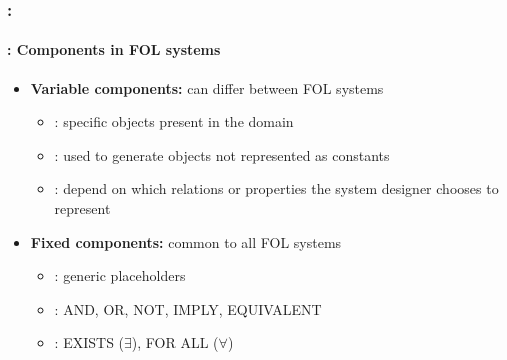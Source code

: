 \documentclass[xcolor=table]{beamer}
\begin{document}
\begin{frame}
	\frametitle{\insertshortsubtitle: \insertsection}
	\framesubtitle{\insertsubsection: Components in FOL systems}
	
	\begin{itemize}
		\item \textbf{Variable components:} can differ between FOL systems
		\begin{itemize}
			\item {}: specific objects present in the domain
			\item {}: used to generate objects not represented as constants
			\item {}: depend on which relations or properties the system designer chooses to represent
		\end{itemize}
		
		\item \textbf{Fixed components:} common to all FOL systems
		\begin{itemize}
			\item {}: generic placeholders
			\item {}: AND, OR, NOT, IMPLY, EQUIVALENT
			\item {}: EXISTS ($\exists$), FOR ALL ($\forall$)
		\end{itemize}
		
	\end{itemize}
	
\end{frame}
\end{document}
